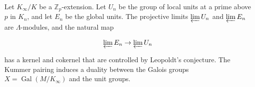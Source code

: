 Let $K_{\infty}/K$ be a $\mathbb{Z}_p$-extension. Let $U_n$ be the group of local units at a prime above $p$ in $K_n$, and let $E_n$ be the global units. The projective limits $\varprojlim U_n$ and $\varprojlim E_n$ are $\Lambda$-modules, and the natural map

$$\varprojlim E_n \to \varprojlim U_n$$

has a kernel and cokernel that are controlled by Leopoldt's conjecture. The Kummer pairing induces a duality between the Galois groups $X = \operatorname{Gal}(M/K_{\infty})$ and the unit groups.
